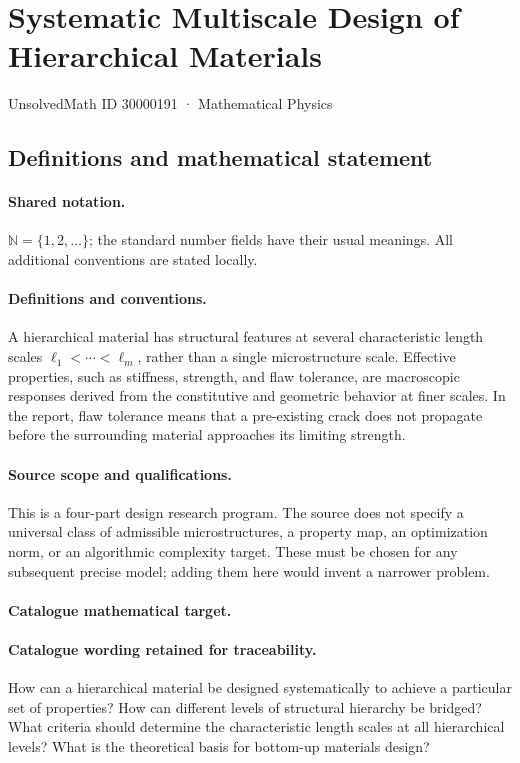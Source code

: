 \documentclass[11pt]{article}
\begin{document}
\setcounter{section}{30000190}
\section{Systematic Multiscale Design of Hierarchical Materials}\label{30000191}
{\small UnsolvedMath ID 30000191 · Mathematical Physics}
\subsection{Definitions and mathematical statement}

\paragraph{Shared notation.}$\mathbb N=\{1,2,\ldots\}$; the standard number fields have their usual meanings. All additional conventions are stated locally.


\paragraph{Definitions and conventions.} A hierarchical material has structural features at several characteristic length scales $\ell_1<\cdots<\ell_m$, rather than a single microstructure scale. Effective properties, such as stiffness, strength, and flaw tolerance, are macroscopic responses derived from the constitutive and geometric behavior at finer scales. In the report, flaw tolerance means that a pre-existing crack does not propagate before the surrounding material approaches its limiting strength.

\paragraph{Source scope and qualifications.} This is a four-part design research program. The source does not specify a universal class of admissible microstructures, a property map, an optimization norm, or an algorithmic complexity target. These must be chosen for any subsequent precise model; adding them here would invent a narrower problem.

\paragraph{Catalogue mathematical target.}
\paragraph{Catalogue wording retained for traceability.}
How can a hierarchical material be designed systematically to achieve a particular set of properties? How can different levels of structural hierarchy be bridged? What criteria should determine the characteristic length scales at all hierarchical levels? What is the theoretical basis for bottom-up materials design?
\end{document}

